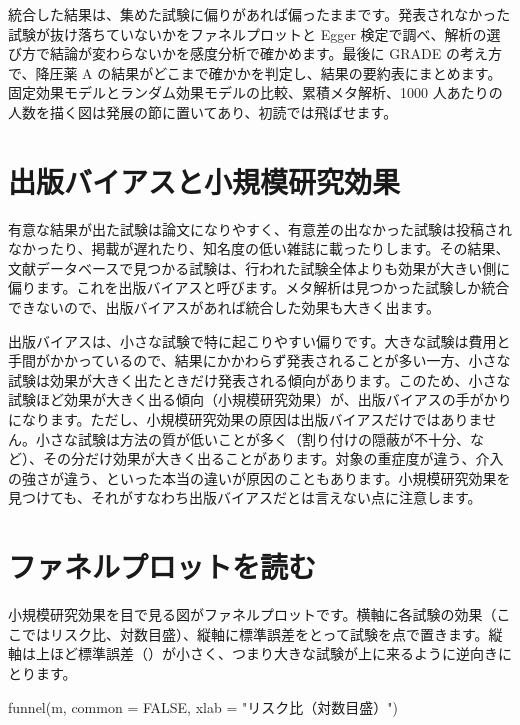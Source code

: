 \begin{chapintro}
統合した結果は、集めた試験に偏りがあれば偏ったままです。発表されなかった試験が抜け落ちていないかをファネルプロットと Egger 検定で調べ、解析の選び方で結論が変わらないかを感度分析で確かめます。最後に GRADE の考え方で、降圧薬 A の結果がどこまで確かかを判定し、結果の要約表にまとめます。固定効果モデルとランダム効果モデルの比較、累積メタ解析、1000 人あたりの人数を描く図は発展の節に置いてあり、初読では飛ばせます。
\end{chapintro}

\section{出版バイアスと小規模研究効果}
\label{sec:07-1}

有意な結果が出た試験は論文になりやすく、有意差の出なかった試験は投稿されなかったり、掲載が遅れたり、知名度の低い雑誌に載ったりします。その結果、文献データベースで見つかる試験は、行われた試験全体よりも効果が大きい側に偏ります。これを出版バイアスと呼びます。メタ解析は見つかった試験しか統合できないので、出版バイアスがあれば統合した効果も大きく出ます。

出版バイアスは、小さな試験で特に起こりやすい偏りです。大きな試験は費用と手間がかかっているので、結果にかかわらず発表されることが多い一方、小さな試験は効果が大きく出たときだけ発表される傾向があります。このため、小さな試験ほど効果が大きく出る傾向（小規模研究効果）が、出版バイアスの手がかりになります。ただし、小規模研究効果の原因は出版バイアスだけではありません。小さな試験は方法の質が低いことが多く（割り付けの隠蔽が不十分、など）、その分だけ効果が大きく出ることがあります。対象の重症度が違う、介入の強さが違う、といった本当の違いが原因のこともあります。小規模研究効果を見つけても、それがすなわち出版バイアスだとは言えない点に注意します。

\section{ファネルプロットを読む}
\label{sec:07-2}

小規模研究効果を目で見る図がファネルプロットです。横軸に各試験の効果（ここではリスク比、対数目盛）、縦軸に標準誤差をとって試験を点で置きます。縦軸は上ほど標準誤差（）が小さく、つまり大きな試験が上に来るように逆向きにとります。

\begin{rcode}
funnel(m, common = FALSE,
       xlab = "リスク比（対数目盛）")
\end{rcode}

